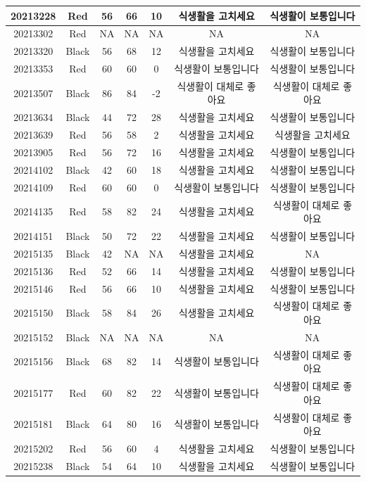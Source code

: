 \documentclass[
]{book}
\begin{document}
\begin{tabular}{c|c|c|c|c|c|c}
\hline
20213228 & Red & 56 & 66 & 10 & 식생활을 고치세요 & 식생활이 보통입니다\\
\hline
20213302 & Red & NA & NA & NA & NA & NA\\
\hline
20213320 & Black & 56 & 68 & 12 & 식생활을 고치세요 & 식생활이 보통입니다\\
\hline
20213353 & Red & 60 & 60 & 0 & 식생활이 보통입니다 & 식생활이 보통입니다\\
\hline
20213507 & Black & 86 & 84 & -2 & 식생활이 대체로 좋아요 & 식생활이 대체로 좋아요\\
\hline
20213634 & Black & 44 & 72 & 28 & 식생활을 고치세요 & 식생활이 보통입니다\\
\hline
20213639 & Red & 56 & 58 & 2 & 식생활을 고치세요 & 식생활을 고치세요\\
\hline
20213905 & Red & 56 & 72 & 16 & 식생활을 고치세요 & 식생활이 보통입니다\\
\hline
20214102 & Black & 42 & 60 & 18 & 식생활을 고치세요 & 식생활이 보통입니다\\
\hline
20214109 & Red & 60 & 60 & 0 & 식생활이 보통입니다 & 식생활이 보통입니다\\
\hline
20214135 & Red & 58 & 82 & 24 & 식생활을 고치세요 & 식생활이 대체로 좋아요\\
\hline
20214151 & Black & 50 & 72 & 22 & 식생활을 고치세요 & 식생활이 보통입니다\\
\hline
20215135 & Black & 42 & NA & NA & 식생활을 고치세요 & NA\\
\hline
20215136 & Red & 52 & 66 & 14 & 식생활을 고치세요 & 식생활이 보통입니다\\
\hline
20215146 & Red & 56 & 66 & 10 & 식생활을 고치세요 & 식생활이 보통입니다\\
\hline
20215150 & Black & 58 & 84 & 26 & 식생활을 고치세요 & 식생활이 대체로 좋아요\\
\hline
20215152 & Black & NA & NA & NA & NA & NA\\
\hline
20215156 & Black & 68 & 82 & 14 & 식생활이 보통입니다 & 식생활이 대체로 좋아요\\
\hline
20215177 & Red & 60 & 82 & 22 & 식생활이 보통입니다 & 식생활이 대체로 좋아요\\
\hline
20215181 & Black & 64 & 80 & 16 & 식생활이 보통입니다 & 식생활이 대체로 좋아요\\
\hline
20215202 & Red & 56 & 60 & 4 & 식생활을 고치세요 & 식생활이 보통입니다\\
\hline
20215238 & Black & 54 & 64 & 10 & 식생활을 고치세요 & 식생활이 보통입니다\\

\end{tabular}
\end{document}
